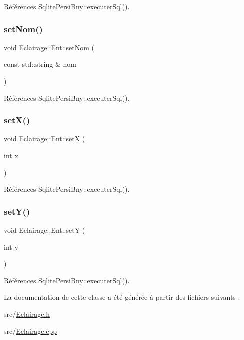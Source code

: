 Références Sqlite\+Persi\+Bny\+::executer\+Sql().

\mbox{\label{classEclairage_1_1Ent_a348836d7b3c2f69f376d63c84ace8e3e}} 
\subsubsection{\texorpdfstring{set\+Nom()}{setNom()}}
{\footnotesize\ttfamily void Eclairage\+::\+Ent\+::set\+Nom (\begin{DoxyParamCaption}\item[{const std\+::string \&}]{nom }\end{DoxyParamCaption})\hspace{0.3cm}{\ttfamily [virtual]}}



Références Sqlite\+Persi\+Bny\+::executer\+Sql().

\mbox{\label{classEclairage_1_1Ent_a4c5528c086dee2b6c5433c6e103f7eeb}} 
\subsubsection{\texorpdfstring{set\+X()}{setX()}}
{\footnotesize\ttfamily void Eclairage\+::\+Ent\+::setX (\begin{DoxyParamCaption}\item[{int}]{x }\end{DoxyParamCaption})\hspace{0.3cm}{\ttfamily [virtual]}}



Références Sqlite\+Persi\+Bny\+::executer\+Sql().

\mbox{\label{classEclairage_1_1Ent_abdf5e31d5b5788c832b964c3712b7231}} 
\subsubsection{\texorpdfstring{set\+Y()}{setY()}}
{\footnotesize\ttfamily void Eclairage\+::\+Ent\+::setY (\begin{DoxyParamCaption}\item[{int}]{y }\end{DoxyParamCaption})\hspace{0.3cm}{\ttfamily [virtual]}}



Références Sqlite\+Persi\+Bny\+::executer\+Sql().



La documentation de cette classe a été générée à partir des fichiers suivants \+:\begin{DoxyCompactItemize}
\item 
src/\hyperlink{Eclairage_8h}{Eclairage.\+h}\item 
src/\hyperlink{Eclairage_8cpp}{Eclairage.\+cpp}\end{DoxyCompactItemize}
